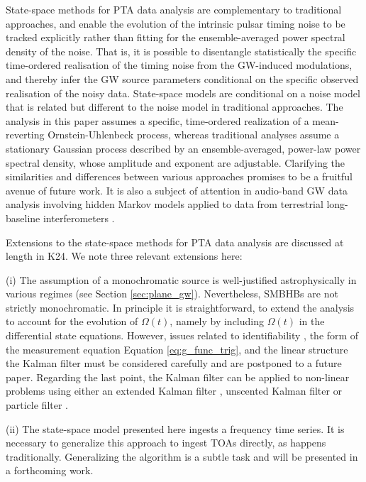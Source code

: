 \documentclass[fleqn,usenatbib,useAMS]{mnras}
\begin{document}
State-space methods for PTA data analysis are complementary to traditional approaches, and enable the evolution of the intrinsic pulsar timing noise to be tracked explicitly rather than fitting for the ensemble-averaged power spectral density of the noise. That is, it is possible to disentangle statistically the specific time-ordered realisation of the timing noise from the GW-induced modulations, and thereby infer the GW source parameters conditional on the specific observed realisation of the noisy data. State-space models are conditional on a noise model that is related but different to the noise model in traditional approaches. The analysis in this paper assumes a specific, time-ordered realization of a mean-reverting Ornstein-Uhlenbeck process, whereas traditional analyses assume a stationary Gaussian process described by an ensemble-averaged, power-law power spectral density, whose amplitude and exponent are adjustable. Clarifying the similarities and differences between various approaches promises to be a fruitful avenue of future work. It is also a subject of attention in audio-band GW data analysis involving hidden Markov models applied to data from terrestrial long-baseline interferometers \citep{PhysRevD.102.023006,PhysRevD.105.022002,Abbott_2022SCO,2022PhRvD.106f2002A}. \newline 





Extensions to the state-space methods for PTA data analysis are discussed at length in K24. We note three relevant extensions here:

(i) The assumption of a monochromatic source is well-justified astrophysically in various regimes (see Section \ref{sec:plane_gw}).  Nevertheless, SMBHBs are not strictly monochromatic. In principle it is straightforward, to extend the analysis to account for the evolution of $\Omega(t)$, namely by including $\Omega(t)$ in the differential state equations. However, issues related to identifiability \citep{e5be7c83a0d24500826f6e1b414d1733}, the form of the measurement equation Equation \eqref{eq:g_func_trig}, and the linear structure the Kalman filter must be considered carefully and are postponed to a future paper. Regarding the last point, the Kalman filter can be applied to non-linear problems using either an extended Kalman filter \citep{zarchan2000fundamentals}, unscented Kalman filter \citep{882463van} or particle filter \citep{Simon10}.

(ii) The state-space model presented here ingests a frequency time series. It is necessary to generalize this approach to ingest TOAs directly, as happens traditionally. Generalizing the algorithm is a subtle task and will be presented in a forthcoming work. 
\end{document}
